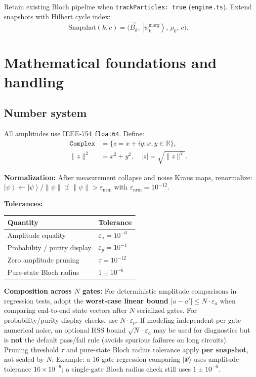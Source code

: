 \documentclass[11pt,a4paper]{article}
\newcommand{\R}{\mathbb{R}}
\newcommand{\ket}[1]{\left|#1\right\rangle}
\begin{document}
Retain existing Bloch pipeline when \texttt{trackParticles: true} (\texttt{engine.ts}). Extend snapshots with Hilbert cycle index:
\begin{equation}
  \mathrm{Snapshot}(k,c) = \bigl(\vec{B}_k,\, \ket{\psi_k^{\mathrm{marg}}},\, \rho_k,\, c\bigr).
\end{equation}

\section{Mathematical foundations and handling}

\subsection{Number system}

All amplitudes use IEEE-754 \texttt{float64}. Define:
\begin{align}
  \texttt{Complex} &= \{z = x + iy : x,y\in\R\}, \\
  \|z\|^2 &= x^2 + y^2, \quad |z| = \sqrt{\|z\|^2}.
\end{align}

\textbf{Normalization:} After measurement collapse and noise Kraus maps, renormalize:
$\ket{\psi}\leftarrow \ket{\psi}/\|\psi\|$ if $\|\psi\|>\varepsilon_{\mathrm{nrm}}$ with $\varepsilon_{\mathrm{nrm}}=10^{-12}$.

\textbf{Tolerances:}
\begin{center}
\begin{tabular}{@{}ll@{}}
\toprule
Quantity & Tolerance \\
\midrule
Amplitude equality & $\varepsilon_a = 10^{-6}$ \\
Probability / purity display & $\varepsilon_p = 10^{-4}$ \\
Zero amplitude pruning & $\tau = 10^{-12}$ \\
Pure-state Bloch radius & $1 \pm 10^{-6}$ \\
\bottomrule
\end{tabular}
\end{center}

\textbf{Composition across $N$ gates:} For deterministic amplitude comparisons in regression tests, adopt the \textbf{worst-case linear bound} $|a-a'| \le N\cdot\varepsilon_a$ when comparing end-to-end state vectors after $N$ serialized gates. For probability/purity display checks, use $N\cdot\varepsilon_p$. If modeling independent per-gate numerical noise, an optional RSS bound $\sqrt{N}\cdot\varepsilon_a$ may be used for diagnostics but is \textbf{not} the default pass/fail rule (avoids spurious failures on long circuits). Pruning threshold $\tau$ and pure-state Bloch radius tolerance apply \textbf{per snapshot}, not scaled by $N$. Example: a 16-gate regression comparing $|\Psi\rangle$ uses amplitude tolerance $16\times 10^{-6}$; a single-gate Bloch radius check still uses $1\pm 10^{-6}$.
\end{document}
